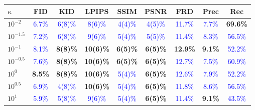 \documentclass[twoside,11pt]{article}
\begin{document}
\begin{table}[ht!]
\centering
\renewcommand{\arraystretch}{1.4}
\setlength{\tabcolsep}{6pt}
\small
\begin{tabular}{lcccccccc}
\toprule
\rowcolor{gray!20}
\textbf{$\kappa$} & \textbf{FID} & \textbf{KID} & \textbf{LPIPS} & \textbf{SSIM} & \textbf{PSNR} & \textbf{FRD} & \textbf{Prec} & \textbf{Rec} \\
\midrule
$10^{-2}$    & \textcolor{blue}{6.7\%} & \textcolor{blue}{6(8)\%} & \textcolor{blue}{8(6)\%} & \textcolor{blue}{4(4)\%} & \textcolor{blue}{4(5)\%} & \textcolor{blue}{11.7\%} & \textcolor{blue}{7.7\%} & \textbf{\textcolor{green!50!black}{69.6\%}} \\
$10^{-1.5}$  & \textcolor{blue}{7.2\%} & \textcolor{blue}{6(8)\%} & \textcolor{blue}{9(6)\%} & \textcolor{blue}{5(4)\%} & \textcolor{blue}{5(5)\%} & \textcolor{blue}{11.4\%} & \textcolor{blue}{8.3\%} & \textcolor{blue}{56.5\%} \\
$10^{-1}$    & \textcolor{blue}{8.1\%} & \textbf{\textcolor{green!50!black}{8(8)\%}} & \textbf{\textcolor{green!50!black}{10(6)\%}} & \textbf{\textcolor{green!50!black}{6(5)\%}} & \textbf{\textcolor{green!50!black}{6(5)\%}} & \textbf{\textcolor{green!50!black}{12.9\%}} & \textbf{\textcolor{green!50!black}{9.1\%}} & \textcolor{blue}{52.2\%} \\
$10^{-0.5}$  & \textcolor{blue}{7.6\%} & \textbf{\textcolor{green!50!black}{8(8)\%}} & \textbf{\textcolor{green!50!black}{10(6)\%}} & \textbf{\textcolor{green!50!black}{6(5)\%}} & \textbf{\textcolor{green!50!black}{6(5)\%}} & \textcolor{blue}{12.7\%} & \textcolor{blue}{7.5\%} & \textcolor{blue}{60.9\%} \\
$10^{0}$     & \textbf{\textcolor{green!50!black}{8.5\%}} & \textbf{\textcolor{green!50!black}{8(8)\%}} & \textbf{\textcolor{green!50!black}{10(6)\%}} & \textcolor{blue}{5(4)\%} & \textbf{\textcolor{green!50!black}{6(5)\%}} & \textcolor{blue}{12.6\%} & \textcolor{blue}{7.9\%} & \textcolor{blue}{52.2\%} \\
$10^{0.5}$   & \textcolor{blue}{6.9\%} & \textcolor{blue}{4(8)\%} & \textbf{\textcolor{green!50!black}{10(6)\%}} & \textcolor{blue}{5(4)\%} & \textbf{\textcolor{green!50!black}{6(5)\%}} & \textcolor{blue}{11.8\%} & \textcolor{blue}{8.6\%} & \textcolor{blue}{56.5\%} \\
$10^{1}$     & \textcolor{blue}{5.9\%} & \textcolor{blue}{5(8)\%} & \textcolor{blue}{9(6)\%} & \textcolor{blue}{5(4)\%} & \textbf{\textcolor{green!50!black}{6(5)\%}} & \textcolor{blue}{11.4\%} & \textbf{\textcolor{green!50!black}{9.1\%}} & \textcolor{blue}{43.5\%} \\

\end{tabular}
\end{table}
\end{document}
